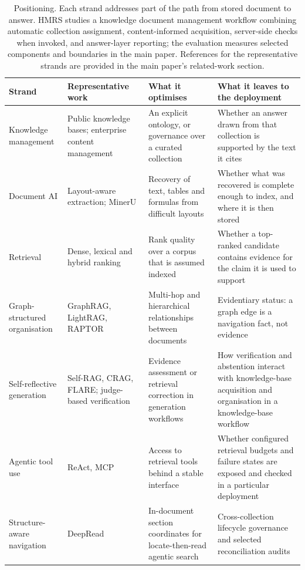 \documentclass[final,5p,times,twocolumn]{elsarticle}
\begin{document}
\begin{table}[t]
\centering
\small
\setlength{\tabcolsep}{4pt}
\renewcommand{\arraystretch}{1.18}
\caption{Positioning. Each strand addresses part of the path from stored
document to answer. HMRS studies a knowledge document management workflow
combining automatic collection assignment, content-informed acquisition,
server-side checks when invoked, and answer-layer reporting; the evaluation
measures selected components and boundaries in the main paper. References for
the representative strands are provided in the main paper's related-work section.}

\begin{tabular}{@{}>{\raggedright\arraybackslash}p{}>{\raggedright\arraybackslash}p{}>{\raggedright\arraybackslash}p{}>{\raggedright\arraybackslash}p{}@{}}
\toprule
Strand & Representative work & What it optimises & What it leaves to the deployment\\
\midrule
Knowledge management & Public knowledge bases; enterprise content management & An explicit ontology, or governance over a curated collection & Whether an answer drawn from that collection is supported by the text it cites\\
Document AI & Layout-aware extraction; MinerU & Recovery of text, tables and formulas from difficult layouts & Whether what was recovered is complete enough to index, and where it is then stored\\
Retrieval & Dense, lexical and hybrid ranking & Rank quality over a corpus that is assumed indexed & Whether a top-ranked candidate contains evidence for the claim it is used to support\\
Graph-structured organisation & GraphRAG, LightRAG, RAPTOR & Multi-hop and hierarchical relationships between documents & Evidentiary status: a graph edge is a navigation fact, not evidence\\
Self-reflective generation & Self-RAG, CRAG, FLARE; judge-based verification & Evidence assessment or retrieval correction in generation workflows & How verification and abstention interact with knowledge-base acquisition and organisation in a knowledge-base workflow\\
Agentic tool use & ReAct, MCP & Access to retrieval tools behind a stable interface & Whether configured retrieval budgets and failure states are exposed and checked in a particular deployment\\
Structure-aware navigation & DeepRead  & In-document section coordinates for locate-then-read agentic search & Cross-collection lifecycle governance and selected reconciliation audits\\

\end{tabular}
\end{table}
\end{document}
